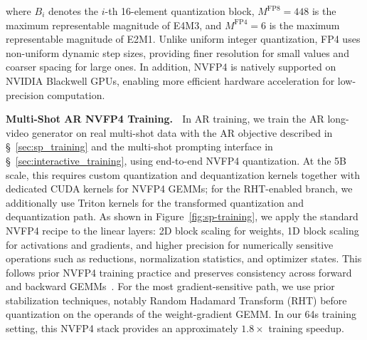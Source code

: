 where $B_i$ denotes the $i$-th 16-element quantization block, $M^{\text{FP8}} = 448$ is the maximum representable magnitude of E4M3, and $M^{\text{FP4}} = 6$ is the maximum representable magnitude of E2M1. Unlike uniform integer quantization, FP4 uses non-uniform dynamic step sizes, providing finer resolution for small values and coarser spacing for large ones. In addition, NVFP4 is natively supported on NVIDIA Blackwell GPUs, enabling more efficient hardware acceleration for low-precision computation.

\textbf{Multi-Shot AR NVFP4 Training.} $\;$
In AR training, we train the AR long-video generator on real multi-shot data with the AR objective described in \S~\ref{sec:sp_training} and the multi-shot prompting interface in \S~\ref{sec:interactive_training}, using end-to-end NVFP4 quantization. At the 5B scale, this requires custom quantization and dequantization kernels together with dedicated CUDA kernels for NVFP4 GEMMs; for the RHT-enabled branch, we additionally use Triton kernels for the transformed quantization and dequantization path. As shown in Figure~\ref{fig:sp-training}, we apply the standard NVFP4 recipe to the linear layers: 2D block scaling for weights, 1D block scaling for activations and gradients, and higher precision for numerically sensitive operations such as reductions, normalization statistics, and optimizer states. This follows prior NVFP4 training practice and preserves consistency across forward and backward GEMMs~\cite{abecassis2025pretraining,castro2025quartet}. For the most gradient-sensitive path, we use prior stabilization techniques, notably Random Hadamard Transform (RHT) before quantization on the operands of the weight-gradient GEMM. In our 64s training setting, this NVFP4 stack provides an approximately $1.8\times$ training speedup.

